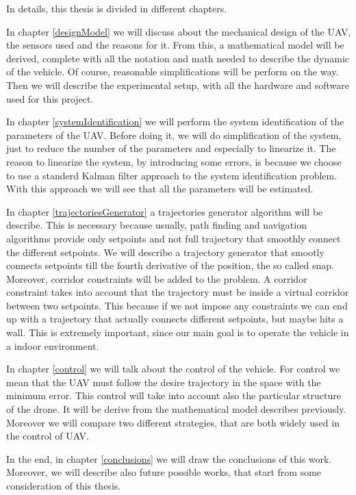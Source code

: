 \noindent In details, this thesis is divided in different chapters.

\noindent In chapter \ref{designModel} we will discuss about the mechanical design of the UAV, the sensors used and the reasons for it. From this, a mathematical model will be derived, complete with all the notation and math needed to describe the dynamic of the vehicle. Of course, reasonable simplifications will be perform on the way. Then we will describe the experimental setup, with all the hardware and software used for this project.

\noindent In chapter \ref{systemIdentification} we will perform the system identification of the parameters of the UAV. Before doing it, we will do simplification of the system, just to reduce the number of the parameters and especially to linearize it. The reason to linearize the system, by introducing some errors, is because we choose to use a standerd Kalman filter approach to the system identification problem. With this approach we will see that all the parameters will be estimated.

\noindent In chapter \ref{trajectoriesGenerator} a trajectories generator algorithm will be describe. This is necessary because usually, path finding and navigation algorithms provide only setpoints and not full trajectory that smoothly connect the different setpoints. We will describe a trajectory generator that smootly connects setpoints till the fourth derivative of the position, the so called snap. Moreover, corridor constraints will be added to the problem. A corridor constraint takes into account that the trajectory must be inside a virtual corridor between two setpoints. This because if we not impose any constraints we can end up with a trajectory that actually connects different setpoints, but maybe hits a wall. This is extremely important, since our main goal is to operate the vehicle in a indoor environment. 

\noindent In chapter \ref{control} we will talk about the control of the vehicle. For control we mean that the UAV must follow the desire trajectory in the space with the minimum error. This control will take into account also the particular structure of the drone. It will be derive from the mathematical model describes previously. Moreover we will compare two different strategies, that are both widely used in the control of UAV.

\noindent In the end, in chapter \ref{conclusions} we will draw the conclusions of this work. Moreover, we will describe also future possible works, that start from some consideration of this thesis. 